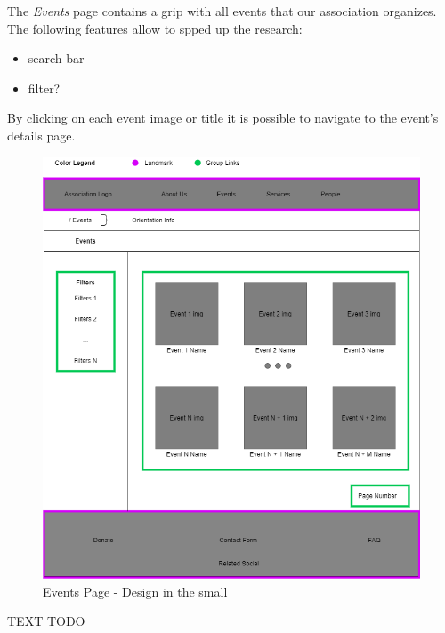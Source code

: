 The \emph{Events} page contains a grip with all events that our association organizes. The following features allow to spped up the research:
\begin{itemize}
	\item search bar
	\item filter?
\end{itemize}

By clicking on each event image or title it is possible to navigate to the event's details page.

\begin{figure}[h!]
		\centering
		\begin{minipage}[b]{1\textwidth}
    			\includegraphics[width=\textwidth]{./assets/events.png}
			\caption{Events Page - Design in the small}
		\end{minipage}
	\end{figure}
	\FloatBarrier


TEXT TODO

